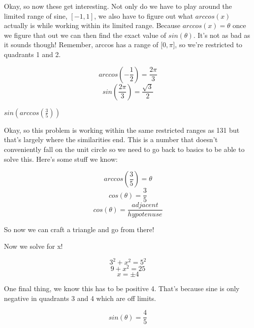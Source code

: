 \documentclass[10pt,letterpaper]{amspset}
\begin{document}
\begin{solution}
    Okay, so now these get interesting. Not only do we have to play around the limited range of sine, $[-1, 1]$, we also have to figure out what $arccos(x)$ actually is while working within its limited range. Because $arccos(x) = \theta$ once we figure that out we can then find the exact value of $sin(\theta)$. It's not as bad as it sounds though! Remember, arccos has a range of $[0, \pi$], so we're restricted to quadrants 1 and 2. 
    
    \medskip
    
    
    \[ arccos\left( -\frac{1}{2} \right) = \frac{2\pi}{3}\]
    \[\boxed{ sin\left( \frac{2\pi}{3} \right) = \frac{\sqrt{3}}{2} }\]
\end{solution}


\pagebreak


\begin{problem}[132]
    $sin \left( arccos \left( \frac{3}{5} \right) \right)$
\end{problem}

\begin{solution}
    Okay, so this problem is working within the same restricted ranges as 131 but that's largely where the similarities end. This is a number that doesn't conveniently fall on the unit circle so we need to go back to basics to be able to solve this. Here's some stuff we know:
    
    \[ arccos\left( \frac{3}{5} \right) = \theta\]
    \[ cos(\theta) = \frac{3}{5} \]
    \[ cos(\theta) = \frac{adjacent}{hypotenuse}\]

    So now we can craft a triangle and go from there! 
    \medskip
    

Now we solve for x! 

\[ 3^2 + x^2 = 5^2\]
\[ 9 + x^2 = 25 \]
\[ x = \pm 4 \]

One final thing, we know this has to be positive 4. That's because sine is only negative in quadrants 3 and 4 which are off limits.

\[\boxed{ sin(\theta) = \frac{4}{5} }\]
\end{solution}
\end{document}
